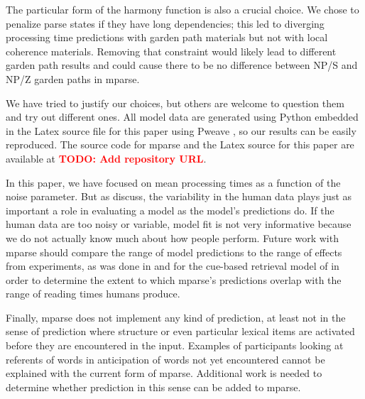 \documentclass[a4paper, 12pt]{article}
\newcommand{\todo}[1]{\textcolor{red}{\textbf{TODO: #1}}}
\begin{document}
The particular form of the harmony function is also a crucial choice. We chose
to penalize parse states if they have long dependencies; this led to diverging
processing time predictions with garden path materials but not with local
coherence materials. Removing that constraint would likely lead to different
garden path results and could cause there to be no difference between NP/S and
NP/Z garden paths in mparse.

We have tried to justify our choices, but others are welcome to question them
and try out different ones. All model data are generated using Python embedded
in the Latex source file for this paper using Pweave \citep{pastell2017pweave},
so our results can be easily reproduced. The source code for mparse and the
Latex source for this paper are available at \todo{Add repository URL}.

In this paper, we have focused on mean processing times as a function of the
noise parameter. But as \citet{roberts2000how} discuss, the variability in the
human data plays just as important a role in evaluating a model as the model's
predictions do. If the human data are too noisy or variable, model fit is not
very informative because we do not actually know much about how people perform.
Future work with mparse should compare the range of model predictions to the
range of effects from experiments, as was done in
\citet{vasishth2018statistical} and \citet{jaeger2019interference} for the
cue-based retrieval model of \citet{lewis2005activation} in order to determine
the extent to which mparse's predictions overlap with the range of reading
times humans produce.

Finally, mparse does not implement any kind of prediction, at least not in the
sense of prediction where structure or even particular lexical items are
activated before they are encountered in the input. Examples of participants
looking at referents of words in anticipation of words not yet encountered
\citep[e.g.,][]{altmann1999incremental, kukona2014lexical} cannot be
explained with the current form of mparse. Additional work is needed to
determine whether prediction in this sense can be added to mparse.
\end{document}
